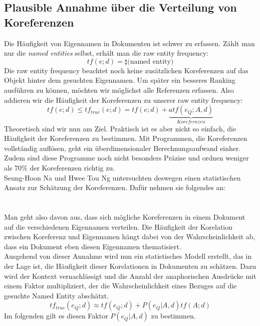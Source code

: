 \subsection{Plausible Annahme über die Verteilung von Koreferenzen}
Die Häufigkeit von Eigennamen in Dokumenten ist schwer zu erfassen. Zählt man nur die \textit{named entities} selbst, erhält man die raw entity frequency:
\[tf\left( e;d \right)=\sharp \text{(named entity)}\]
Die raw entity frequency beachtet  noch keine zusätzlichen Koreferenzen auf das Objekt hinter dem gesuchten Eigennamen. Um später ein besseres Ranking ausführen zu können, möchten wir möglichst alle Referenzen erfassen. Also addieren wir die Häufigkeit der Koreferenzen zu unserer raw entity frequency:
\[tf\left( e;d \right)\leq tf_{true}\left( e;d \right)=tf\left( e;d \right)+\underbrace{atf(e_Q;A,d)}_{Korefernzen}\]
Theoretisch sind wir nun am Ziel. Praktisch ist es aber nicht so einfach, die Häufigkeit der Koreferenzen zu bestimmen. Mit Programmen, die Koreferenzen vollständig auflösen, geht ein überdimensionaler Berechnungsaufwand einher. Zudem sind diese Programme noch nicht besonders Präzise und ordnen weniger als 70\% der Koreferenzen richtig zu.\cite{paper:Na}
\\
Seung-Hoon Na und Hwee Tou Ng untersuchten deswegen einen statistischen Ansatz zur Schätzung der Koreferenzen. Dafür nehmen sie folgendes an:
\\
\\
\\
Man geht also davon aus, dass sich mögliche Koreferenzen in einem Dokument auf die verschiedenen Eigennamen verteilen. Die Häufigkeit der Korelation zwischen Koreferenz und Eigennamen hängt dabei von der Wahrscheinlichkeit ab, dass ein Dokument eben diesen Eigennamen thematisiert.\\
Ausgehend von dieser Annahme wird nun ein statistisches Modell erstellt, das in der Lage ist, die Häufigkeit dieser Korelationen in Dokumenten zu schätzen. Dazu wird der Kontext vernachlässigt und die Anzahl der anaphorischen Ausdrücke mit einem Faktor multipliziert, der die Wahrscheinlichkeit eines Bezuges auf die gesuchte Named Entity abschätzt.
\[ tf_{true} \left( e_Q ; d \right) \approx tf \left( e_Q ; d \right) + P\left( e_Q | A,d \right)tf\left( A;d \right) \]
Im folgenden gilt es diesen Faktor $P\left( e_Q | A,d \right)$ zu bestimmen.
